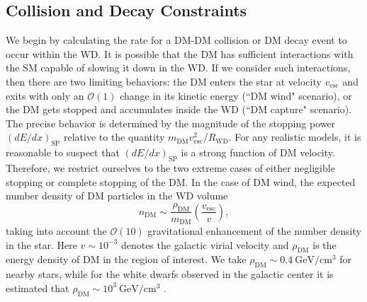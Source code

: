 \documentclass[twocolumn,preprintnumbers,amsmath,amssymb,prl, superscriptaddress]{revtex4}
\newcommand{\OO}{\mathcal{O}}
\newcommand{\GeV}{\text{GeV}}
\def\r{\right)}
\def\l{\left(}
\begin{document}
\subsection{Collision and Decay Constraints}
\label{sec:CollisionConstraints}

We begin by calculating the rate for a DM-DM collision or DM decay event to occur within the WD.
It is possible that the DM has sufficient interactions with the SM capable of slowing it down in the WD.
If we consider such interactions, then there are two limiting behaviors: the DM enters the star at velocity $v_\text{esc}$ and exits with only an $\OO(1)$ change in its kinetic energy (``DM wind" scenario), or the DM gets stopped and accumulates inside the WD (``DM capture" scenario).
The precise behavior is determined by the magnitude of the stopping power $(dE/dx)_\text{SP}$ relative to the quantity $m_\text{DM} v_\text{esc}^2/R_\text{WD}$. 
For any realistic models, it is reasonable to suspect that $(dE/dx)_\text{SP}$ is a strong function of DM velocity.
Therefore, we restrict ourselves to the two extreme cases of either negligible stopping or complete stopping of the DM. 
In the case of DM wind, the expected number density of DM particles in the WD volume 
\begin{equation}
n_\text{DM} \sim \frac{\rho_{\text{DM}}}{m_\text{DM}} \l \frac{v_\text{esc}}{v}\r,
\end{equation}
taking into account the $\OO(10)$ gravitational enhancement of the number density in the star. 
Here $v \sim 10^{-3}$ denotes the galactic virial velocity and $\rho_\text{DM}$ is the energy density of DM in the region of interest. 
We take $\rho_\text{DM} \sim 0.4 ~\GeV/\text{cm}^3$ for nearby stars, while for the white dwarfs observed in the galactic center it is estimated that $\rho_\text{DM} \sim 10^3 ~\text{GeV}/\text{cm}^3$ \cite{Nesti:2013uwa}.
\end{document}
